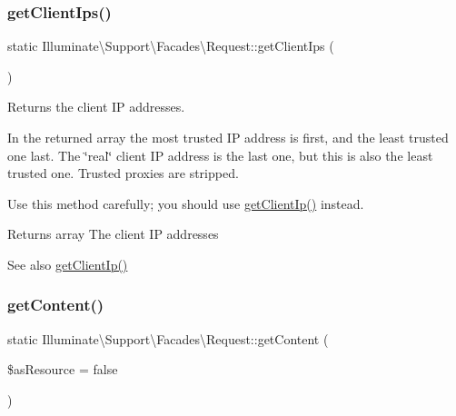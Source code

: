\subsubsection{\texorpdfstring{get\+Client\+Ips()}{getClientIps()}}
{\footnotesize\ttfamily static Illuminate\textbackslash{}\+Support\textbackslash{}\+Facades\textbackslash{}\+Request\+::get\+Client\+Ips (\begin{DoxyParamCaption}{ }\end{DoxyParamCaption})\hspace{0.3cm}{\ttfamily [static]}}

Returns the client IP addresses.

In the returned array the most trusted IP address is first, and the least trusted one last. The \char`\"{}real\char`\"{} client IP address is the last one, but this is also the least trusted one. Trusted proxies are stripped.

Use this method carefully; you should use \mbox{\hyperlink{class_illuminate_1_1_support_1_1_facades_1_1_request_ac78e7218a697e138ce105a04d49f2ff7}{get\+Client\+Ip()}} instead.

\begin{DoxyReturn}{Returns}
array The client IP addresses 
\end{DoxyReturn}
\begin{DoxySeeAlso}{See also}
\mbox{\hyperlink{class_illuminate_1_1_support_1_1_facades_1_1_request_ac78e7218a697e138ce105a04d49f2ff7}{get\+Client\+Ip()}} 
\end{DoxySeeAlso}
\mbox{\label{class_illuminate_1_1_support_1_1_facades_1_1_request_a1b836840a59e484da9ceaf51a92605de}} 
\subsubsection{\texorpdfstring{get\+Content()}{getContent()}}
{\footnotesize\ttfamily static Illuminate\textbackslash{}\+Support\textbackslash{}\+Facades\textbackslash{}\+Request\+::get\+Content (\begin{DoxyParamCaption}\item[{}]{\$as\+Resource = {\ttfamily false} }\end{DoxyParamCaption})\hspace{0.3cm}{\ttfamily [static]}}

